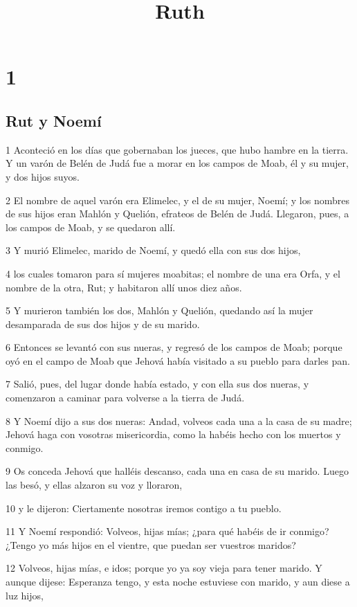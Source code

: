 

\title{Ruth}

\chapter{1}

\section*{Rut y Noemí}

\par 1 Aconteció en los días que gobernaban los jueces, que hubo hambre en la tierra. Y un varón de Belén de Judá fue a morar en los campos de Moab, él y su mujer, y dos hijos suyos.
\par 2 El nombre de aquel varón era Elimelec, y el de su mujer, Noemí; y los nombres de sus hijos eran Mahlón y Quelión, efrateos de Belén de Judá. Llegaron, pues, a los campos de Moab, y se quedaron allí.
\par 3 Y murió Elimelec, marido de Noemí, y quedó ella con sus dos hijos,
\par 4 los cuales tomaron para sí mujeres moabitas; el nombre de una era Orfa, y el nombre de la otra, Rut; y habitaron allí unos diez años.
\par 5 Y murieron también los dos, Mahlón y Quelión, quedando así la mujer desamparada de sus dos hijos y de su marido.
\par 6 Entonces se levantó con sus nueras, y regresó de los campos de Moab; porque oyó en el campo de Moab que Jehová había visitado a su pueblo para darles pan.
\par 7 Salió, pues, del lugar donde había estado, y con ella sus dos nueras, y comenzaron a caminar para volverse a la tierra de Judá.
\par 8 Y Noemí dijo a sus dos nueras: Andad, volveos cada una a la casa de su madre; Jehová haga con vosotras misericordia, como la habéis hecho con los muertos y conmigo.
\par 9 Os conceda Jehová que halléis descanso, cada una en casa de su marido. Luego las besó, y ellas alzaron su voz y lloraron,
\par 10 y le dijeron: Ciertamente nosotras iremos contigo a tu pueblo.
\par 11 Y Noemí respondió: Volveos, hijas mías; ¿para qué habéis de ir conmigo? ¿Tengo yo más hijos en el vientre, que puedan ser vuestros maridos?
\par 12 Volveos, hijas mías, e idos; porque yo ya soy vieja para tener marido. Y aunque dijese: Esperanza tengo, y esta noche estuviese con marido, y aun diese a luz hijos,
